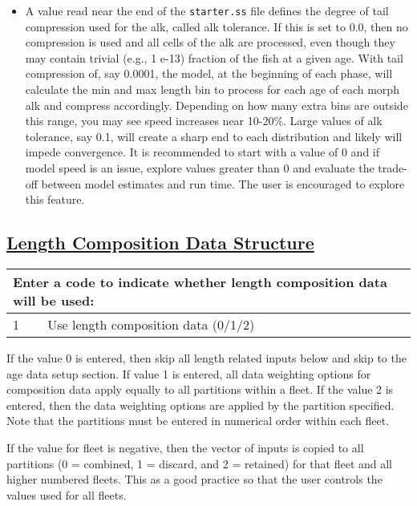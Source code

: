 \begin{itemize}
	\item A value read near the end of the \texttt{starter.ss} file defines the degree of tail compression used for the \gls{alk}, called \gls{alk} tolerance. If this is set to 0.0, then no compression is used and all cells of the \gls{alk} are processed, even though they may contain trivial (e.g., 1 e-13) fraction of the fish at a given age. With tail compression of, say 0.0001, the model, at the beginning of each phase, will calculate the min and max length bin to process for each age of each morph \gls{alk} and compress accordingly. Depending on how many extra bins are outside this range, you may see speed increases near 10-20\%. Large values of \gls{alk} tolerance, say 0.1, will create a sharp end to each distribution and likely will impede convergence. It is recommended to start with a value of 0 and if model speed is an issue, explore values greater than 0 and evaluate the trade-off between model estimates and run time. The user is encouraged to explore this feature.
\end{itemize}

\hypertarget{length-comp-structure}{}
\subsection[Length Composition Data Structure]{\protect\hyperlink{length-comp-structure}{Length Composition Data Structure}}
\begin{tabular}{p{2cm} p{13cm}}
		\multicolumn{2}{l}{Enter a code to indicate whether length composition data will be used:} \Tstrut\Bstrut\\
		\hline	
		1 & Use length composition data (0/1/2) \Tstrut\Bstrut\\
		\hline									  
\end{tabular}

If the value 0 is entered, then skip all length related inputs below and skip to the age data setup section. If value 1 is entered, all data weighting options for composition data apply equally to all partitions within a fleet. If the value 2 is entered, then the data weighting options are applied by the partition specified. Note that the partitions must be entered in numerical order within each fleet.

If the value for fleet is negative, then the vector of inputs is copied to all partitions (0 = combined, 1 = discard, and 2 = retained) for that fleet and all higher numbered fleets. This as a good practice so that the user controls the values used for all fleets.

